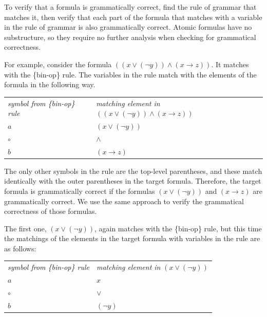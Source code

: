 To verify that a formula is grammatically correct,
find the rule of grammar that matches it,
then verify that each part of the formula
that matches with a variable in the rule of grammar
is also grammatically correct.
Atomic formulas have no substructure,
so they require no further analysis when checking for grammatical correctness.

For example, consider the formula
$((x \vee (\neg y)) \wedge (x \rightarrow z))$.
It matches with the \{bin-op\} rule.
The variables in the rule match
with the elements of the formula in the following way.
\begin{center}
\begin{tabular}{ll}
\emph{symbol from \{bin-op\} rule}      & \emph{matching element in} $((x \vee (\neg y)) \wedge (x \rightarrow z))$ \\
$a$                                     & $(x \vee (\neg y))$ \\
$\circ$                                 & $\wedge$ \\
$b$                                     & $(x \rightarrow z)$ \\
\end{tabular}
\end{center}

The only other symbols in the rule are the top-level parentheses, and these match identically with the outer parentheses in the target formula. Therefore, the target formula is grammatically correct if the formulas $(x \vee (\neg y))$ and $(x \rightarrow z)$  are grammatically correct. We use the same approach to verify the grammatical correctness of those formulas.

The first one, $(x \vee (\neg y))$,
again matches with the \{bin-op\} rule,
but this time the matchings of the elements
in the target formula with variables in the rule are as follows:
\begin{center}
\begin{tabular}{ll}
\emph{symbol from \{bin-op\} rule}      & \emph{matching element in}  $(x \vee (\neg y))$ \\
$a$                                     & $x$ \\
$\circ$                                 & $\vee$ \\
$b$                                     & $(\neg y)$ \\
\end{tabular}
\end{center}

